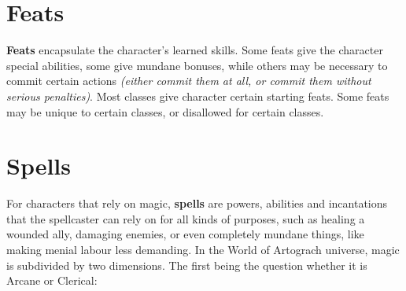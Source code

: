 \documentclass[openany,11pt,a4paper]{book}
\begin{document}
\section{Feats}
\textbf{Feats} encapsulate the character's learned skills. Some feats give the character special abilities, some give mundane bonuses, while others may be necessary to commit certain actions \textit{(either commit them at all, or commit them without serious penalties)}. Most classes give character certain starting feats. Some feats may be unique to certain classes, or disallowed for certain classes.
\section{Spells}
For characters that rely on magic, \textbf{spells} are powers, abilities and incantations that the spellcaster can rely on for all kinds of purposes, such as healing a wounded ally, damaging enemies, or even completely mundane things, like making menial labour less demanding. In the World of Artograch universe, magic is subdivided by two dimensions. The first being the question whether it is Arcane or Clerical:
\end{document}
